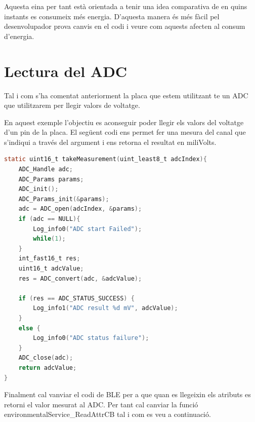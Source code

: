 Aquesta eina per tant està orientada a tenir una idea comparativa de en quins instants es consumeix més energia.
D'aquesta manera és més fàcil pel desenvolupador prova canvis en el codi i veure com aquests afecten al consum d'energia.




\section{Lectura del ADC}
Tal i com s'ha comentat anteriorment la placa que estem utilitzant te un ADC que utilitzarem per llegir valors de voltatge.

En aquest exemple l'objectiu es aconseguir poder llegir els valors del voltatge d'un pin de la placa.
El següent codi ens permet fer una mesura del canal que s'indiqui a través del argument i ens retorna el resultat en miliVolts.

\begin{lstlisting}[language=C]
static uint16_t takeMeasurement(uint_least8_t adcIndex){
	ADC_Handle adc;
	ADC_Params params;
	ADC_init();
	ADC_Params_init(&params);
	adc = ADC_open(adcIndex, &params);
	if (adc == NULL){
		Log_info0("ADC start Failed");
		while(1);
	}
	int_fast16_t res;
	uint16_t adcValue;
	res = ADC_convert(adc, &adcValue);
	
	if (res == ADC_STATUS_SUCCESS) {
		Log_info1("ADC result %d mV", adcValue);
	}
	else {
		Log_info0("ADC status failure");
	}
	ADC_close(adc);
	return adcValue;
}
\end{lstlisting}

Finalment cal vanviar el codi de BLE per a que quan es llegeixin els atributs es retorni el valor mesurat al ADC.
Per tant cal canviar la funció environmentalService\_ReadAttrCB tal i com es veu a continuació.

